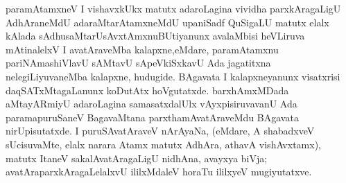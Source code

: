paramAtamxneV I vishavxkUkx matutx adaroLagina vividha parxkAragaLigU AdhAra\-neMdU adaraMtarAtamxneMdU upaniSadf QuSigaLU matutx elalx kAlada sAdhusaMtarU\break sAvxtAmxnuBUtiyanunx avalaMbisi heVLiruva mAtinalelxV I avatAraveMba kalapxne,\break eMdare, paramAtamxnu pariNAmashiVlavU sAMtavU sApeVkiSxkavU Ada jagatitxna nele\-giLiyuvaneMba kalapxne, hudugide. BAgavata I kalapxneyanunx visatxrisi daqSATxMtagaLanunx koDutAtx hoVgutatxde. barxhAmxMDada aMtayARmiyU adaroLagina samasatxdalUlx vAyxpisiruvavanU Ada paramapuruSaneV BagavaMtana parxthamAvatAraveMdu BAgavata nirUpisutatxde. I puruSAvatAraveV nArAyaNa, (eMdare, A shabadxveV sUcisuvaMte, elalx narara Atamx matutx AdhAra, athavA vishAvxtamx), matutx ItaneV sakalAvatAragaLigU nidhAna, avayxya biVja; avatAraparxkAragaLelalxvU ililxMdaleV horaTu ililxyeV mugiyutatxve.


